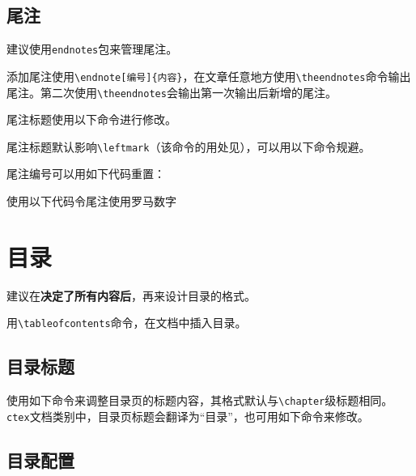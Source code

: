 \documentclass[10pt,openany]{book}
\begin{document}
\begin{sloppypar}


\section{尾注}

建议使用\texttt{endnotes}包来管理尾注。

添加尾注使用\texttt{\textbackslash{}endnote{[}编号{]}\{内容\}}，在文章任意地方使用\texttt{\textbackslash{}theendnotes}命令输出尾注。第二次使用\texttt{\textbackslash{}theendnotes}会输出第一次输出后新增的尾注。

尾注标题使用以下命令进行修改。



尾注标题默认影响\texttt{\textbackslash{}leftmark}（该命令的用处见\textit{}），可以用以下命令规避。



尾注编号可以用如下代码重置：



使用以下代码令尾注使用罗马数字



\chapter{目录}

建议在\textbf{决定了所有内容后}，再来设计目录的格式。

用\texttt{\textbackslash{}tableofcontents}命令，在文档中插入目录。

\section{目录标题}

使用如下命令来调整目录页的标题内容，其格式默认与\texttt{\textbackslash{}chapter}级标题相同。\texttt{ctex}文档类别中，目录页标题会翻译为“目录”，也可用如下命令来修改。



\section{目录配置}


\end{sloppypar}
\end{document}
